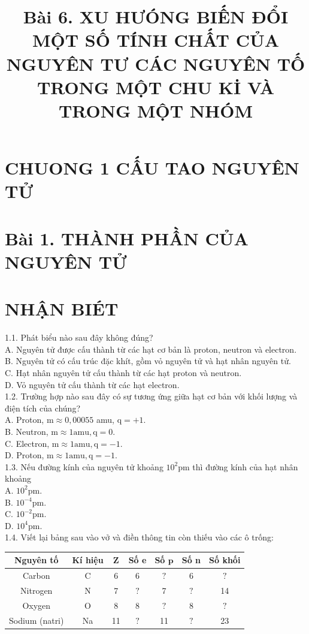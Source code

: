 \documentclass[10pt]{article}
\title{Bài 6. XU HƯÓNG BIẾN ĐỔI MỘT SỐ TÍNH CHẤT CỦA NGUYÊN TƯ CÁC NGUYÊN TỐ TRONG MỘT CHU Kİ VÀ TRONG MỘT NHÓM }
\author{}
\date{}
\begin{document}
\maketitle
\captionsetup{singlelinecheck=false}
\section*{CHUONG 1 CẤU TAO NGUYÊN TỬ}
\section*{Bài 1. THÀNH PHẦN CỦA NGUYÊN TỬ}
\section*{NHẬN BIÉT}
1.1. Phát biểu nào sau đây không đúng?\\
A. Nguyên tử được cấu thành từ các hạt cơ bản là proton, neutron và electron.\\
B. Nguyên tử có cấu trúc đặc khít, gồm vỏ nguyên tử và hạt nhân nguyên tử.\\
C. Hạt nhân nguyên tử cấu thành từ các hạt proton và neutron.\\
D. Vỏ nguyên tử cấu thành từ các hạt electron.\\
1.2. Trường hợp nào sau đây có sự tương ứng giữa hạt cơ bản với khối lượng và điện tích của chúng?\\
A. Proton, $\mathrm{m} \approx 0,00055$ amu, $\mathrm{q}=+1$.\\
B. Neutron, $\mathrm{m} \approx 1 \mathrm{amu}, \mathrm{q}=0$.\\
C. Electron, $\mathrm{m} \approx 1 \mathrm{amu}, \mathrm{q}=-1$.\\
D. Proton, $\mathrm{m} \approx 1 \mathrm{amu}, \mathrm{q}=-1$.\\
1.3. Nếu đường kính của nguyên tử khoảng $10^{2} \mathrm{pm}$ thì đường kính của hạt nhân khoảng\\
A. $10^{2} \mathrm{pm}$.\\
B. $10^{-4} \mathrm{pm}$.\\
C. $10^{-2} \mathrm{pm}$.\\
D. $10^{4} \mathrm{pm}$.\\
1.4. Viết lại bảng sau vào vở và điền thông tin còn thiếu vào các ô trống:

\begin{center}
\begin{tabular}{|c|c|c|c|c|c|c|}
\hline
Nguyên tố & Kí hiệu & Z & Số e & Số $\mathbf{p}$ & Số n & Số khối \\
\hline
Carbon & C & 6 & 6 & $?$ & 6 & $?$ \\
\hline
Nitrogen & N & 7 & $?$ & 7 & $?$ & 14 \\
\hline
Oxygen & O & 8 & 8 & $?$ & 8 & $?$ \\
\hline
Sodium (natri) & Na & 11 & $?$ & 11 & $?$ & 23 \\
\hline
\end{tabular}
\end{center}
\end{document}
